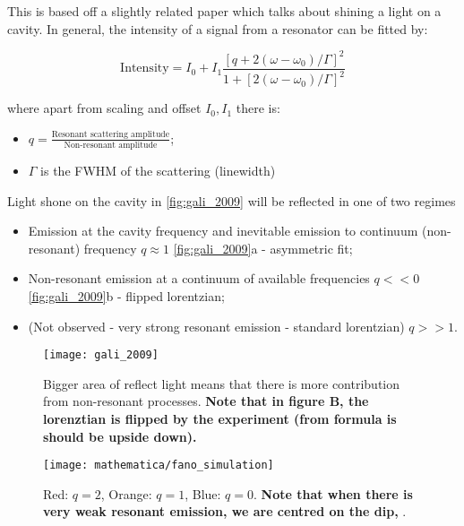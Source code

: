    This is based off a  slightly related paper \cite{Galli_2009} which
   talks about shining a light on  a cavity. In general, the intensity
   of a signal from a resonator can be fitted by:

   \begin{framed}\noindent
     \begin{equation}
       \text{Intensity} = I_0 + I_1 \frac{\left[ q + 2(\omega - \omega_{0})/\Gamma \right]^2}{1 + \left[ 2(\omega - \omega_0)/\Gamma \right]^2}
     \end{equation}

     \noindent where  apart from scaling  and offset $I_0,  I_1$ there
     is:
     \begin{itemize}
     \item
       $q          =          \frac{\text{Resonant          scattering
           amplitude}}{\text{Non-resonant amplitude}}$;
     \item $\Gamma$ is the FWHM of the scattering (linewidth)
     \end{itemize}
   \end{framed}

   \noindent Light shone on the cavity in \autoref{fig:gali_2009} will
   be reflected in one of two regimes
   \begin{itemize}
   \item Emission at  the cavity frequency and  inevitable emission to
     continuum    (non-resonant)    frequency    \hfill    $q\approx1$
     \autoref{fig:gali_2009}a - asymmetric fit;
   \item Non-resonant emission at a continuum of available frequencies
     \hfill $q << 0$ \autoref{fig:gali_2009}b - flipped lorentzian;
   \item  (Not observed  - very  strong resonant  emission -  standard
     lorentzian) \hfill $q >> 1$.
   \end{itemize}

     \begin{figure}[h]
       \centering \texttt{[image: gali\_2009]}
       \caption{\small Bigger  area of reflect light  means that there
         is   more    contribution   from    non-resonant   processes.
         \textbf{Note that in  figure B, the lorenztian  is flipped by
           the   experiment  (from   formula  is   should  be   upside
           down).}\label{fig:gali_2009}}
     \end{figure}

\begin{figure}[h]
  \centering \texttt{[image: mathematica/fano\_simulation]}
  \caption{\small   Red:   $q=2$,    Orange:   $q=1$,   Blue:   $q=0$.
    \textbf{Note that  when there is  very weak resonant  emission, we
      are centred on the dip,  }.\label{fig:fano_simulation}}
\end{figure}

